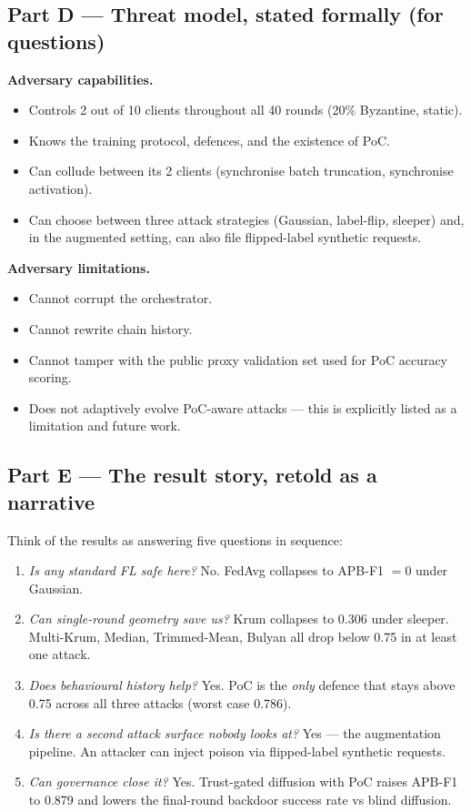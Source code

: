 \documentclass[11pt,a4paper]{article}
\begin{document}
\subsection{Part D --- Threat model, stated formally (for questions)}

\textbf{Adversary capabilities.}
\begin{itemize}
\item Controls 2 out of 10 clients throughout all 40 rounds (20\% Byzantine, static).
\item Knows the training protocol, defences, and the existence of PoC.
\item Can collude between its 2 clients (synchronise batch truncation, synchronise activation).
\item Can choose between three attack strategies (Gaussian, label-flip, sleeper) and, in the augmented setting, can also file flipped-label synthetic requests.
\end{itemize}

\textbf{Adversary limitations.}
\begin{itemize}
\item Cannot corrupt the orchestrator.
\item Cannot rewrite chain history.
\item Cannot tamper with the public proxy validation set used for PoC accuracy scoring.
\item Does not adaptively evolve PoC-aware attacks --- this is explicitly listed as a limitation and future work.
\end{itemize}

\subsection{Part E --- The result story, retold as a narrative}

Think of the results as answering five questions in sequence:

\begin{enumerate}
\item \emph{Is any standard FL safe here?} No. FedAvg collapses to APB-F1 $=0$ under Gaussian.
\item \emph{Can single-round geometry save us?} Krum collapses to 0.306 under sleeper. Multi-Krum, Median, Trimmed-Mean, Bulyan all drop below 0.75 in at least one attack.
\item \emph{Does behavioural history help?} Yes. PoC is the \emph{only} defence that stays above 0.75 across all three attacks (worst case 0.786).
\item \emph{Is there a second attack surface nobody looks at?} Yes --- the augmentation pipeline. An attacker can inject poison via flipped-label synthetic requests.
\item \emph{Can governance close it?} Yes. Trust-gated diffusion with PoC raises APB-F1 to 0.879 and lowers the final-round backdoor success rate vs blind diffusion.
\end{enumerate}
\end{document}
